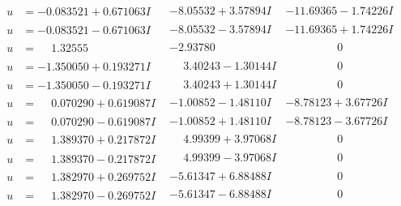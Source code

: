 \documentclass[1p]{elsarticle_modified}
\theoremstyle{definition}
\begin{document}
$$\begin{array}{c|c|c}
\begin{aligned}
u &= -0.083521 + 0.671063 I\end{aligned}
 & -8.05532 + 3.57894 I & -11.69365 - 1.74226 I \\ \hline\begin{aligned}
u &= -0.083521 - 0.671063 I\end{aligned}
 & -8.05532 - 3.57894 I & -11.69365 + 1.74226 I \\ \hline\begin{aligned}
u &= \phantom{-}1.32555\phantom{ +0.000000I}\end{aligned}
 & -2.93780\phantom{ +0.000000I} & \phantom{-0.000000 } 0 \\ \hline\begin{aligned}
u &= -1.350050 + 0.193271 I\end{aligned}
 & \phantom{-}3.40243 - 1.30144 I & \phantom{-0.000000 } 0 \\ \hline\begin{aligned}
u &= -1.350050 - 0.193271 I\end{aligned}
 & \phantom{-}3.40243 + 1.30144 I & \phantom{-0.000000 } 0 \\ \hline\begin{aligned}
u &= \phantom{-}0.070290 + 0.619087 I\end{aligned}
 & -1.00852 - 1.48110 I & -8.78123 + 3.67726 I \\ \hline\begin{aligned}
u &= \phantom{-}0.070290 - 0.619087 I\end{aligned}
 & -1.00852 + 1.48110 I & -8.78123 - 3.67726 I \\ \hline\begin{aligned}
u &= \phantom{-}1.389370 + 0.217872 I\end{aligned}
 & \phantom{-}4.99399 + 3.97068 I & \phantom{-0.000000 } 0 \\ \hline\begin{aligned}
u &= \phantom{-}1.389370 - 0.217872 I\end{aligned}
 & \phantom{-}4.99399 - 3.97068 I & \phantom{-0.000000 } 0 \\ \hline\begin{aligned}
u &= \phantom{-}1.382970 + 0.269752 I\end{aligned}
 & -5.61347 + 6.88488 I & \phantom{-0.000000 } 0 \\ \hline\begin{aligned}
u &= \phantom{-}1.382970 - 0.269752 I\end{aligned}
 & -5.61347 - 6.88488 I & \phantom{-0.000000 } 0 \\ \hline\begin{aligned}

\end{aligned}
\end{array}$$
\end{document}
